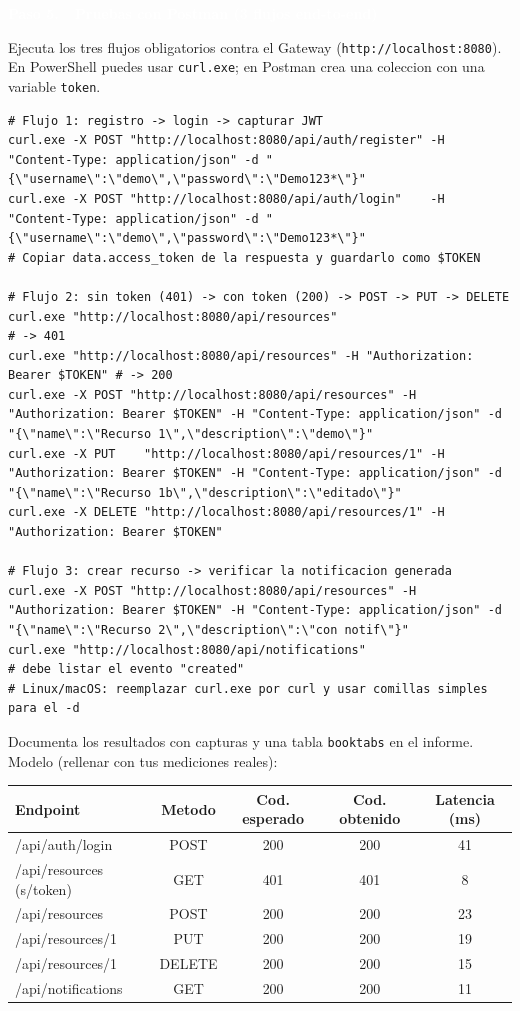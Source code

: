 \documentclass[11pt]{article}
\newcommand{\pasohead}[2]{%
\vspace{4pt}%
\begin{tcolorbox}[colback=azulMedio,colframe=azulMedio,boxrule=0pt,arc=2pt,left=8pt,right=8pt,top=4pt,bottom=4pt]
\textcolor{white}{\textbf{Paso #1.\ \ #2}}\end{tcolorbox}}
\begin{document}
\pasohead{5}{Pruebas con Postman (3 flujos end-to-end)}
Ejecuta los tres flujos obligatorios contra el Gateway (\texttt{http://localhost:8080}). En PowerShell puedes usar \texttt{curl.exe}; en Postman crea una coleccion con una variable \texttt{token}.

\begin{lstlisting}[language=shell]
# Flujo 1: registro -> login -> capturar JWT
curl.exe -X POST "http://localhost:8080/api/auth/register" -H "Content-Type: application/json" -d "{\"username\":\"demo\",\"password\":\"Demo123*\"}"
curl.exe -X POST "http://localhost:8080/api/auth/login"    -H "Content-Type: application/json" -d "{\"username\":\"demo\",\"password\":\"Demo123*\"}"
# Copiar data.access_token de la respuesta y guardarlo como $TOKEN

# Flujo 2: sin token (401) -> con token (200) -> POST -> PUT -> DELETE
curl.exe "http://localhost:8080/api/resources"                                   # -> 401
curl.exe "http://localhost:8080/api/resources" -H "Authorization: Bearer $TOKEN" # -> 200
curl.exe -X POST "http://localhost:8080/api/resources" -H "Authorization: Bearer $TOKEN" -H "Content-Type: application/json" -d "{\"name\":\"Recurso 1\",\"description\":\"demo\"}"
curl.exe -X PUT    "http://localhost:8080/api/resources/1" -H "Authorization: Bearer $TOKEN" -H "Content-Type: application/json" -d "{\"name\":\"Recurso 1b\",\"description\":\"editado\"}"
curl.exe -X DELETE "http://localhost:8080/api/resources/1" -H "Authorization: Bearer $TOKEN"

# Flujo 3: crear recurso -> verificar la notificacion generada
curl.exe -X POST "http://localhost:8080/api/resources" -H "Authorization: Bearer $TOKEN" -H "Content-Type: application/json" -d "{\"name\":\"Recurso 2\",\"description\":\"con notif\"}"
curl.exe "http://localhost:8080/api/notifications"                                # debe listar el evento "created"
# Linux/macOS: reemplazar curl.exe por curl y usar comillas simples para el -d
\end{lstlisting}

Documenta los resultados con capturas y una tabla \texttt{booktabs} en el informe. Modelo (rellenar con tus mediciones reales):

\begin{center}\small
\begin{tabular}{lcccc}
\toprule
\textbf{Endpoint} & \textbf{Metodo} & \textbf{Cod. esperado} & \textbf{Cod. obtenido} & \textbf{Latencia (ms)} \\
\midrule
/api/auth/login        & POST   & 200 & 200 & 41 \\
/api/resources (s/token) & GET  & 401 & 401 & 8  \\
/api/resources         & POST   & 200 & 200 & 23 \\
/api/resources/1       & PUT    & 200 & 200 & 19 \\
/api/resources/1       & DELETE & 200 & 200 & 15 \\
/api/notifications     & GET    & 200 & 200 & 11 \\
\bottomrule
\end{tabular}
\end{center}
\end{document}
